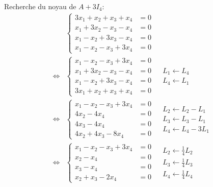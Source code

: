 Recherche du noyau de $A + 3I_4$:
\begin{align*}
  &\left\lbrace
  \begin{aligned}
    3x_1 + x_2 + x_3 + x_4 &= 0\\
    x_1 + 3x_2 - x_3 - x_4 &= 0\\
    x_1 - x_2 + 3x_3 - x_4 &= 0\\
    x_1 - x_2 - x_3 + 3x_4 &= 0
  \end{aligned}
  \right. \\
  \Leftrightarrow
  &\left\lbrace
  \begin{aligned}
    x_1 - x_2 - x_3 + 3x_4 &= 0\\
    x_1 + 3x_2 - x_3 - x_4 &= 0\\
    x_1 - x_2 + 3x_3 - x_4 &= 0\\
    3x_1 + x_2 + x_3 + x_4 &= 0
  \end{aligned}
  \right. 
  &\begin{aligned}
     L_1 \leftarrow L_4 \\
     L_4 \leftarrow L_1 
   \end{aligned}
\\
  \Leftrightarrow
  &\left\lbrace
  \begin{aligned}
    x_1 - x_2 - x_3 + 3x_4 &= 0\\
         4x_2       - 4x_4 &= 0\\
               4x_3 - 4x_4 &= 0\\
         4x_2 + 4x_3 - 8x_4 &= 0
  \end{aligned}
  \right. 
  &\begin{aligned}
     L_2 \leftarrow L_2 -L_1 \\
     L_3 \leftarrow L_3 -L_1 \\
     L_4 \leftarrow L_4 - 3L_1
   \end{aligned}
\\
  \Leftrightarrow
  &\left\lbrace
  \begin{aligned}
    x_1 - x_2 - x_3 + 3x_4 &= 0\\
          x_2        - x_4 &= 0\\
                x_3  - x_4 &= 0\\
          x_2  + x_3 - 2x_4 &= 0
  \end{aligned}
  \right. &\begin{aligned}
     L_2 \leftarrow \frac{1}{4}L_2 \\
     L_3 \leftarrow \frac{1}{4}L_3 \\
     L_4 \leftarrow \frac{1}{4}L_4 

\end{aligned}
\end{align*}
